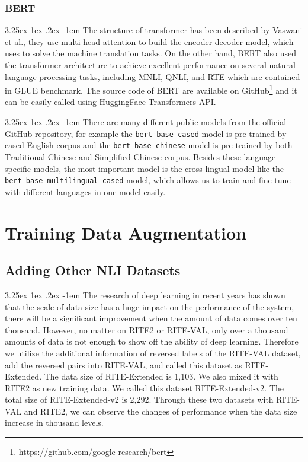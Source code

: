 \documentclass[12pt]{article}
\makeatletter
\renewcommand\paragraph{\@startsection{paragraph}{5}{\z@}%
  {3.25ex \@plus1ex \@minus.2ex}%
  {-1em}%
  {\normalfont\normalsize\bfseries}}
\makeatother
\begin{document}
\begin{CJK*}{UTF8}{bkai}
\begin{spacing}{1.77}
\subsubsection{BERT}
\paragraph{}
The structure of transformer\cite{vaswani2017attention} has been described by Vaswani et al., they use multi-head attention to build the encoder-decoder model, which uses to solve the machine translation tasks. On the other hand, BERT\cite{devlin2018bert} also used the transformer architecture to achieve excellent performance on several natural language processing tasks, including MNLI, QNLI, and RTE which are contained in GLUE benchmark. The source code of BERT are available on GitHub\footnote{https://github.com/google-research/bert} and it can be easily called using HuggingFace Transformers API\cite{wolf-etal-2020-transformers}.

\paragraph{}
There are many different public models from the official GitHub repository, for example the \texttt{bert-base-cased} model is pre-trained by cased English corpus and the \texttt{bert-base-chinese} model is pre-trained by both Traditional Chinese and Simplified Chinese corpus. Besides these language-specific models, the most important model is the cross-lingual model like the \texttt{bert-base-multilingual-cased} model, which allows us to train and fine-tune with different languages in one model easily.

\section{Training Data Augmentation} \label{section:pseudo}
\subsection{Adding Other NLI Datasets} \label{section:add_other_nli}
\paragraph{}
The research of deep learning in recent years has shown that the scale of data size has a huge impact on the performance of the system, there will be a significant improvement when the amount of data comes over ten thousand. However, no matter on RITE2 or RITE-VAL, only over a thousand amounts of data is not enough to show off the ability of deep learning. Therefore we utilize the additional information of reversed labels of the RITE-VAL dataset, add the reversed pairs into RITE-VAL, and called this dataset as RITE-Extended. The data size of RITE-Extended is 1,103. We also mixed it with RITE2 as new training data. We called this dataset RITE-Extended-v2. The total size of RITE-Extended-v2 is 2,292. Through these two datasets with RITE-VAL and RITE2, we can observe the changes of performance when the data size increase in thousand levels.


\end{spacing}
\end{CJK*}
\end{document}
